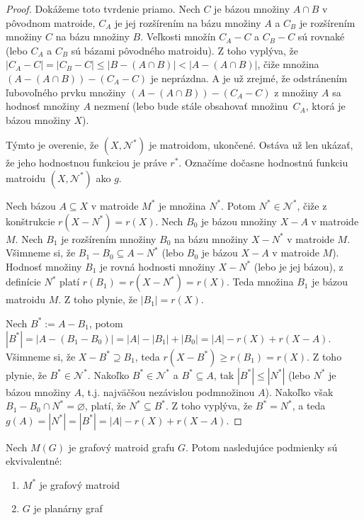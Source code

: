 \begin{proof}
Dokážeme toto tvrdenie priamo.
Nech $C$ je bázou množiny $A \cap B$ v pôvodnom matroide, $C_A$ je jej rozšírením na bázu množiny $A$ a $C_B$ je rozšírením množiny $C$ na bázu množiny $B$.
Veľkosti množín $C_A - C$ a $C_B - C$ sú rovnaké (lebo $C_A$ a $C_B$ sú bázami pôvodného matroidu).
Z toho vyplýva, že $|C_A - C| = |C_B - C| \leq |B - (A \cap B)| < |A - (A \cap B)|$, čiže množina $(A-(A \cap B))-(C_A-C)$ je neprázdna.
A je už zrejmé, že odstránením ľubovoľného prvku množiny $(A-(A \cap B))-(C_A-C)$ z množiny $A$ sa hodnosť množiny $A$ nezmení (lebo bude stále obsahovať množinu~$C_A$, ktorá je bázou množiny $X$).

Týmto je overenie, že $(X, \mathcal{N}^*)$ je matroidom, ukončené.
Ostáva už len ukázať, že jeho hodnostnou funkciou je práve $r^*$.
Označíme dočasne hodnostnú funkciu matroidu $(X, \mathcal{N}^*)$ ako $g$.

Nech bázou $A \subseteq X$ v matroide $M^*$ je množina $N^*$.
Potom $N^* \in \mathcal{N}^*$, čiže z konštrukcie $r(X - N^*) = r(X)$.
Nech $B_0$ je bázou množiny $X-A$ v matroide $M$.
Nech $B_1$ je rozšírením množiny $B_0$ na bázu množiny $X-N^*$ v matroide $M$.
Všimneme si, že $B_1 - B_0 \subseteq A-N^*$ (lebo $B_0$ je bázou $X - A$ v matroide $M$).
Hodnosť množiny $B_1$ je rovná hodnosti množiny $X - N^*$ (lebo je jej bázou), z definície $N^*$ platí $r(B_1) = r(X - N^*) = r(X)$.
Teda množina $B_1$ je bázou matroidu $M$.
Z toho plynie, že $|B_1| = r(X)$.

Nech $B^* := A - B_1$, potom $|B^*| = |A - (B_1-B_0)| = |A| - |B_1| + |B_0| = |A| - r(X) + r(X - A)$. 
Všimneme si, že $X - B^* \supseteq B_1$, teda $r(X - B^*) \geq r(B_1) = r(X)$.
Z toho plynie, že $B^* \in \mathcal{N}^*$.
Nakoľko $B^* \in \mathcal{N}^*$ a $B^* \subseteq A$, tak $|B^*| \leq |N^*|$ (lebo $N^*$ je bázou množiny $A$, t.j. najväčšou nezávislou podmnožinou $A$).
Nakoľko však $B_1 - B_0 \cap N^* = \varnothing$, platí, že $N^* \subseteq B^*$.
Z toho vyplýva, že $B^* = N^*$, a teda $g(A) = |N^*| = |B^*| = |A| - r(X) + r(X - A)$.
\end{proof}


\begin{theorem_hard}
Nech $M(G)$ je grafový matroid grafu $G$. Potom nasledujúce podmienky sú ekvivalentné:
\begin{enumerate}
    \item $M^*$ je grafový matroid
    \item $G$ je planárny graf
\end{enumerate}
\end{theorem_hard}

